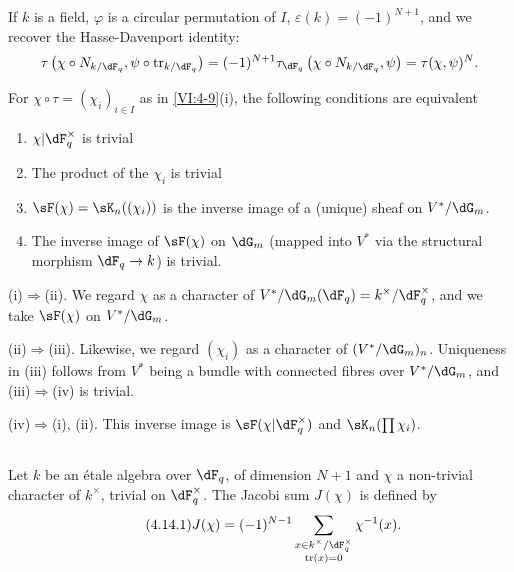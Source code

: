 If $k$ is a field, $\varphi$ is a circular permutation of $I$,
$\varepsilon(k) = (-1)^{N+1}$, and we recover the Hasse-Davenport identity: 
\[
  \tau\left(\chi\circ N_{k/\dF_q},\psi\circ \tr_{k/\dF_q}\right) = (-1)^{N+1} \tau_{\dF_q}\left(\chi\circ N_{k/\dF_q},\psi\right) = \tau(\chi,\psi)^N \text{.} 
\]





\begin{lemma_}\label{VI:4-13}
For $\chi\circ \tau=(\chi_i)_{i\in I}$ as in \ref{VI:4-9}(i), the
following conditions are equivalent 
\begin{enumerate}[\indent (i)]
  \item $\chi| \dF_q^\times$ is trivial
  \item The product of the $\chi_i$ is trivial
  \item $\sF(\chi) = \sK_n((\chi_i))$ is the inverse image of a (unique)
    sheaf on $V^\ast/\dG_m$.
  \item The inverse image of $\sF(\chi)$ on $\dG_m$ (mapped into
    $V^\ast$ via the structural morphism $\dF_q \to k$) is trivial.
\end{enumerate}
\end{lemma_}

(i)$\Rightarrow$(ii). We regard $\chi$ as a character of
$V^\ast/\dG_m(\dF_q)=k^\times/\dF_q^\times$, and we take $\sF(\chi)$ on
$V^\ast/\dG_m$.

(ii)$\Rightarrow$(iii). Likewise, we regard $(\chi_i)$ as a character
of $(V^\ast/\dG_m)_n$. Uniqueness in (iii) follows from $V^\ast$ being
a bundle with connected fibres over $V^\ast/\dG_m$, and (iii)$\Rightarrow$(iv)
is trivial.

(iv)$\Rightarrow$(i), (ii). This inverse image is
$\sF(\chi|\dF_q^\times)$ and $\sK_n(\prod \chi_i)$. 





\subsection{}\label{VI:4-14}

Let $k$ be an étale algebra over $\dF_q$, of
dimension $N+1$ and $\chi$ a non-trivial character of $k^\times$, trivial on
$\dF_q^\times$. The Jacobi sum $J(\chi)$ is defined by 
\begin{equation*}\tag{4.14.1}\label{VI:eq:4-14-1}
  J(\chi) = (-1)^{N-1} \sum_{\substack{x\in k^\times/\dF_q^\times \\ \tr(x)=0}} \chi^{-1}(x) \text{.} 
\end{equation*}

